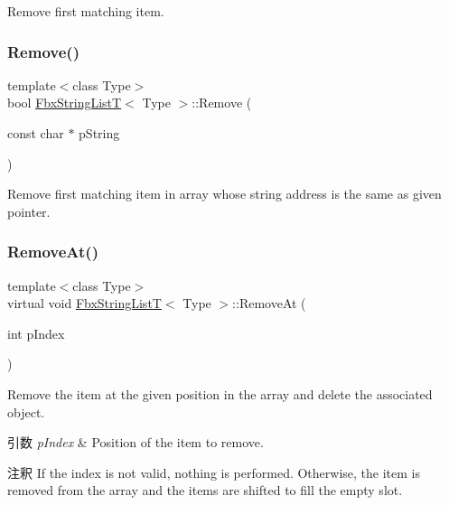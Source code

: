 Remove first matching item. 

\mbox{\label{class_fbx_string_list_t_ad8581d1b4206633b7c0ccfebe8bb3bdf}} 
\subsubsection{\texorpdfstring{Remove()}{Remove()}\hspace{0.1cm}{\footnotesize\ttfamily [2/2]}}
{\footnotesize\ttfamily template$<$class Type$>$ \\
bool \hyperlink{class_fbx_string_list_t}{Fbx\+String\+ListT}$<$ Type $>$\+::Remove (\begin{DoxyParamCaption}\item[{const char $\ast$}]{p\+String }\end{DoxyParamCaption})}



Remove first matching item in array whose string address is the same as given pointer. 

\mbox{\label{class_fbx_string_list_t_afef2030e06b13d23e998cbc6ea6ff9a3}} 
\subsubsection{\texorpdfstring{Remove\+At()}{RemoveAt()}}
{\footnotesize\ttfamily template$<$class Type$>$ \\
virtual void \hyperlink{class_fbx_string_list_t}{Fbx\+String\+ListT}$<$ Type $>$\+::Remove\+At (\begin{DoxyParamCaption}\item[{int}]{p\+Index }\end{DoxyParamCaption})\hspace{0.3cm}{\ttfamily [virtual]}}

Remove the item at the given position in the array and delete the associated object. 
\begin{DoxyParams}{引数}
{\em p\+Index} & Position of the item to remove. \\
\hline
\end{DoxyParams}
\begin{DoxyRemark}{注釈}
If the index is not valid, nothing is performed. Otherwise, the item is removed from the array and the items are shifted to fill the empty slot. 
\end{DoxyRemark}
\mbox{\label{class_fbx_string_list_t_a810bce1e1440e69c6e44a657cfe5d2a3}} 
